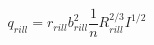\documentclass{article}
\begin{document}
 

$$
   q_{rill} = r_{rill}b_{rill}^2 \frac{1}{n} R_{rill}^{2/3} I^{1/2}
$$
 
\end{document}
